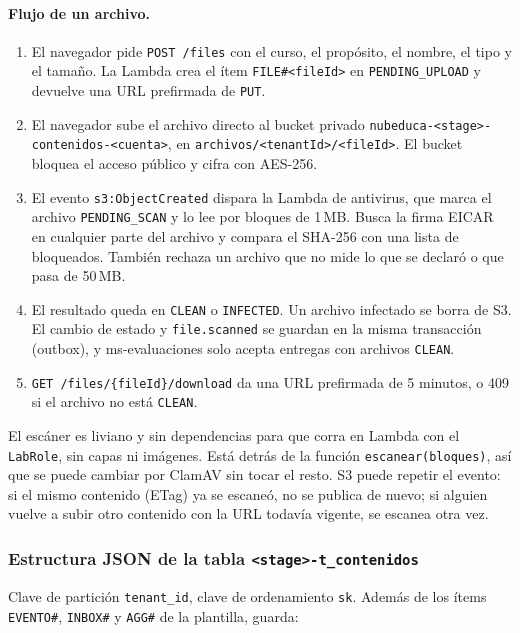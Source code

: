 \paragraph{Flujo de un archivo.}
\begin{enumerate}
  \item El navegador pide \texttt{POST /files} con el curso, el propósito, el nombre, el tipo y el
        tamaño. La Lambda crea el ítem \texttt{FILE\#<fileId>} en \texttt{PENDING\_UPLOAD} y devuelve una
        URL prefirmada de \texttt{PUT}.
  \item El navegador sube el archivo directo al bucket privado
        \texttt{nubeduca-<stage>-contenidos-<cuenta>}, en \texttt{archivos/<tenantId>/<fileId>}. El
        bucket bloquea el acceso público y cifra con AES-256.
  \item El evento \texttt{s3:ObjectCreated} dispara la Lambda de antivirus, que marca el archivo
        \texttt{PENDING\_SCAN} y lo lee por bloques de 1\,MB. Busca la firma EICAR en cualquier parte del
        archivo y compara el SHA-256 con una lista de bloqueados. También rechaza un archivo que no mide
        lo que se declaró o que pasa de 50\,MB.
  \item El resultado queda en \texttt{CLEAN} o \texttt{INFECTED}. Un archivo infectado se borra de S3.
        El cambio de estado y \texttt{file.scanned} se guardan en la misma transacción (outbox), y
        ms-evaluaciones solo acepta entregas con archivos \texttt{CLEAN}.
  \item \texttt{GET /files/\{fileId\}/download} da una URL prefirmada de 5 minutos, o 409 si el archivo
        no está \texttt{CLEAN}.
\end{enumerate}
El escáner es liviano y sin dependencias para que corra en Lambda con el \texttt{LabRole}, sin capas ni
imágenes. Está detrás de la función \texttt{escanear(bloques)}, así que se puede cambiar por ClamAV sin
tocar el resto. S3 puede repetir el evento: si el mismo contenido (ETag) ya se escaneó, no se publica de
nuevo; si alguien vuelve a subir otro contenido con la URL todavía vigente, se escanea otra vez.

\subsubsection{Estructura JSON de la tabla \texttt{<stage>-t\_contenidos}}
Clave de partición \texttt{tenant\_id}, clave de ordenamiento \texttt{sk}. Además de los ítems
\texttt{EVENTO\#}, \texttt{INBOX\#} y \texttt{AGG\#} de la plantilla, guarda:

